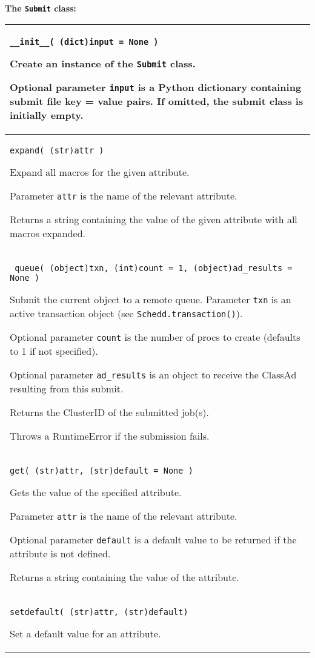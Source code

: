 \textbf{The \texttt{Submit} class:}
\begin{flushleft}
\begin{tabular}{|p{16cm}|} \hline

\texttt{\_\_init\_\_( (dict)input = None )}

Create an instance of the \texttt{Submit} class.  

Optional parameter \texttt{input} is a Python dictionary containing
submit file key = value pairs.
If omitted, the submit class is initially empty.

\\ \hline
\texttt{expand( (str)attr )}

Expand all macros for the given attribute.

Parameter \texttt{attr} is the name of the relevant attribute.

Returns a string containing the value of the given attribute with
all macros expanded.

\\ \hline
\texttt{ queue( (object)txn, (int)count = 1, (object)ad\_results = None )}

Submit the current object to a remote queue.
Parameter \texttt{txn} is an active transaction object (see
\texttt{Schedd.transaction()}).

Optional parameter \texttt{count} is the number of procs to create
(defaults to 1 if not specified).

Optional parameter \texttt{ad\_results} is an object to receive the
ClassAd resulting from this submit.

Returns the ClusterID of the submitted job(s).

Throws a RuntimeError if the submission fails.

\\ \hline
\texttt{get( (str)attr, (str)default = None )}

Gets the value of the specified attribute.

Parameter \texttt{attr} is the name of the relevant attribute.

Optional parameter \texttt{default} is a default value to be returned
if the attribute is not defined.

Returns a string containing the value of the attribute.

\\ \hline
\texttt{setdefault( (str)attr, (str)default)}

Set a default value for an attribute.


\end{tabular}
\end{flushleft}
